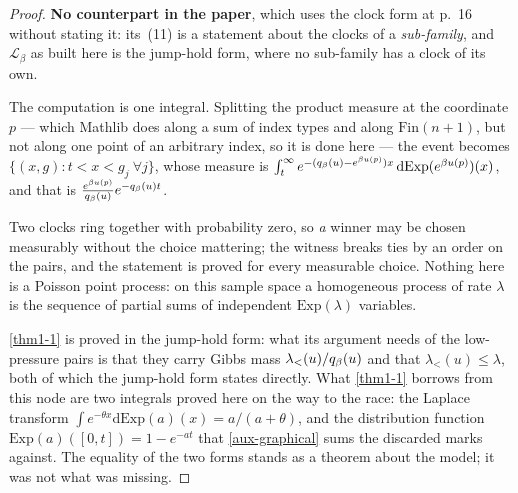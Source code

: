 \begin{proof}
  \leanok
  \textbf{No counterpart in the paper}, which uses the clock form at p.~16
  without stating it: its~(11) is a statement about the clocks of a
  \emph{sub-family}, and $\mathcal{L}_\beta$ as built here is the jump-hold
  form, where no sub-family has a clock of its own.

  The computation is one integral.  Splitting the product measure at the
  coordinate $p$ --- which Mathlib does along a sum of index types and along
  $\mathrm{Fin}(n+1)$, but not along one point of an arbitrary index, so it is
  done here --- the event becomes $\{(x,g) : t < x < g_j \ \forall j\}$, whose
  measure is $\int_t^\infty e^{-(q_\beta(u) - e^{\beta u(p)})x}\,
  \mathrm{d}\mathrm{Exp}(e^{\beta u(p)})(x)$, and that is
  $\frac{e^{\beta u(p)}}{q_\beta(u)} e^{-q_\beta(u)t}$.

  Two clocks ring together with probability zero, so \emph{a} winner may be
  chosen measurably without the choice mattering; the witness breaks ties by an
  order on the pairs, and the statement is proved for every measurable choice.
  Nothing here is a Poisson point process: on this sample space a homogeneous
  process of rate $\lambda$ is the sequence of partial sums of independent
  $\mathrm{Exp}(\lambda)$ variables.

  \ref{thm1-1} is proved in the jump-hold form: what
  its argument needs of the low-pressure pairs is that they carry Gibbs mass
  $\lambda_<(u)/q_\beta(u)$ and that $\lambda_<(u) \le \lambda$, both of which the
  jump-hold form states directly.  What \ref{thm1-1} borrows from this node are two
  integrals proved here on the way to the race: the Laplace transform $\int
  e^{-\theta x} \mathrm{d}\mathrm{Exp}(a)(x) = a/(a+\theta)$, and the distribution
  function $\mathrm{Exp}(a)([0,t]) = 1 - e^{-at}$ that \ref{aux-graphical} sums the
  discarded marks against.  The equality of the two
  forms stands as a theorem about the model; it was not what was missing.
\end{proof}

